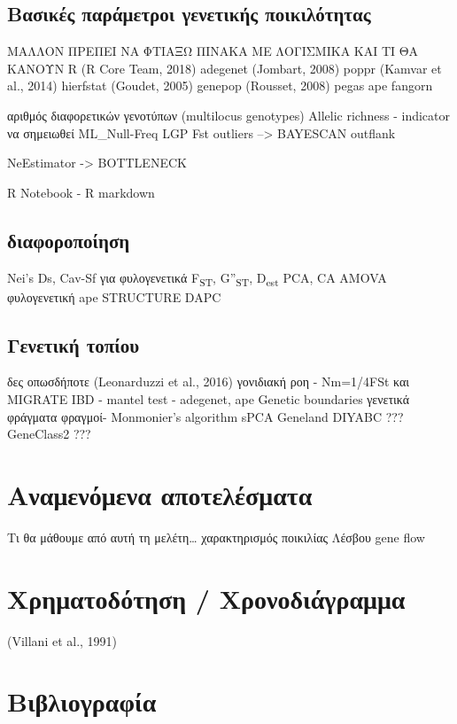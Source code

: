 \documentclass[12pt,a4paper,]{report}
\begin{document}
\hypertarget{---}{%
\subsection{Βασικές παράμετροι γενετικής ποικιλότητας}\label{---}}

ΜΑΛΛΟΝ ΠΡΕΠΕΙ ΝΑ ΦΤΙΑΞΩ ΠΙΝΑΚΑ ΜΕ ΛΟΓΙΣΜΙΚΑ ΚΑΙ ΤΙ ΘΑ ΚΑΝΟΥΝ R (R Core
Team, 2018) adegenet (Jombart, 2008) poppr (Kamvar et al., 2014)
hierfstat (Goudet, 2005) genepop (Rousset, 2008) pegas ape fangorn

αριθμός διαφορετικών γενοτύπων (multilocus genotypes) Allelic richness -
indicator να σημειωθεί ML\_Null-Freq LGP Fst outliers --\textgreater{}
BAYESCAN outflank

NeEstimator -\textgreater{} BOTTLENECK

R Notebook - R markdown

\subsection{διαφοροποίηση}

Nei's Ds, Cav-Sf για φυλογενετικά F\textsubscript{ST},
G''\textsubscript{ST}, D\textsubscript{est} PCA, CA AMOVA φυλογενετική
ape STRUCTURE DAPC

\hypertarget{-}{%
\subsection{Γενετική τοπίου}\label{-}}

δες οπωσδήποτε (Leonarduzzi et al., 2016) γονιδιακή ροη - Nm=1/4FSt και
MIGRATE IBD - mantel test - adegenet, ape Genetic boundaries γενετικά
φράγματα φραγμοί- Monmonier's algorithm sPCA Geneland DIYABC ???
GeneClass2 ???

\hypertarget{-}{%
\section{Αναμενόμενα αποτελέσματα}\label{-}}

Τι θα μάθουμε από αυτή τη μελέτη\ldots{} χαρακτηρισμός ποικιλίας Λέσβου
gene flow

\hypertarget{-}{%
\section{Χρηματοδότηση / Χρονοδιάγραμμα}\label{-}}

(Villani et al., 1991)

\section{Βιβλιογραφία}
\end{document}
